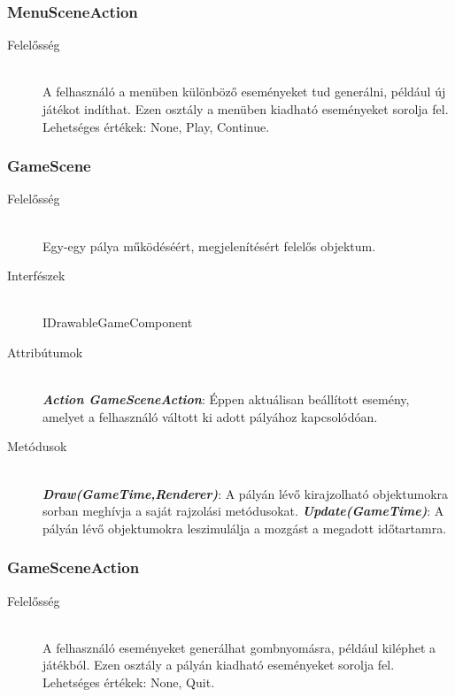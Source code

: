 \subsubsection{MenuSceneAction}
	\begin{description}
		\item[Felelősség] \hfill \\
		A felhasználó a menüben különböző eseményeket tud generálni, például új játékot indíthat. Ezen osztály a menüben kiadható eseményeket sorolja fel. Lehetséges értékek: None, Play, Continue.
	\end{description}
	
\subsubsection{GameScene}
	\begin{description}
		\item[Felelősség] \hfill \\
		Egy-egy pálya működéséért, megjelenítésért felelős objektum.
		\item[Interfészek]\hfill \\
		IDrawableGameComponent
		\item[Attribútumok]\hfill \\
		\textbf{\emph{Action GameSceneAction}}: Éppen aktuálisan beállított esemény, amelyet a felhasználó váltott ki adott pályához kapcsolódóan.
		\item[Metódusok]\hfill \\
		\textbf{\emph{Draw(GameTime,Renderer)}}: A pályán lévő kirajzolható objektumokra sorban meghívja a saját rajzolási metódusokat.
		\textbf{\emph{Update(GameTime)}}: A pályán lévő objektumokra leszimulálja a mozgást a megadott időtartamra.
	\end{description}
	
\subsubsection{GameSceneAction}
	\begin{description}
		\item[Felelősség] \hfill \\
		A felhasználó eseményeket generálhat gombnyomásra, például kiléphet a játékból. Ezen osztály a pályán kiadható eseményeket sorolja fel. Lehetséges értékek: None, Quit.
	\end{description}
	
